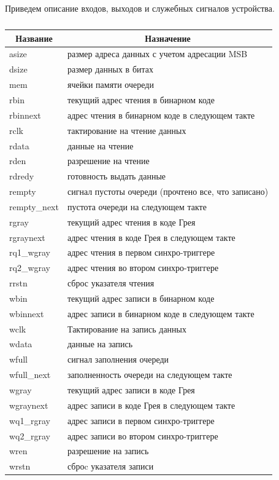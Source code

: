 Приведем описание входов, выходов и служебных сигналов устройства.


\begin{table}[htbp]
	\caption{}
	\centering
	\fontsize{12}{16pt}\selectfont
	\begin{tabular}{|l|l|}
		\hline
		\multicolumn{1}{|c}{\textbf{Название}} & \multicolumn{1}{|c|}{\textbf{Назначение}} \\ \hline
		asize  &  размер адреса данных с учетом адресации MSB \\ \hline
		dsize  &  размер данных в битах \\ \hline
		mem  &  ячейки памяти очереди \\ \hline
		rbin  &  текущий адрес чтения в бинарном коде \\ \hline
		rbinnext  &  адрес чтения в бинарном коде в следующем такте \\ \hline
		rclk  &  тактирование на чтение данных \\ \hline
		rdata  &  данные на чтение \\ \hline
		rden  &  разрешение на чтение \\ \hline
		rdredy  &  готовность выдать данные \\ \hline
		rempty  &  сигнал пустоты очереди (прочтено все, что записано) \\ \hline
		rempty\_next  &  пустота очереди на следующем такте \\ \hline
		rgray  &  текущий адрес чтения в коде Грея \\ \hline
		rgraynext  &  адрес чтения в коде Грея в следующем такте \\ \hline
		rq1\_wgray  &  адрес чтения в первом синхро-триггере \\ \hline
		rq2\_wgray  &  адрес чтения во втором синхро-триггере \\ \hline
		rrstn  &  сброс указателя чтения \\ \hline
		wbin  &  текущий адрес записи в бинарном коде \\ \hline
		wbinnext  &  адрес записи в бинарном коде в следующем такте \\ \hline
		wclk  &  Тактирование на запись данных \\ \hline
		wdata  &  данные на запись \\ \hline
		wfull  &  сигнал заполнения очереди \\ \hline
		wfull\_next  &  заполненность очереди на следующем такте \\ \hline
		wgray  &  текущий адрес записи в коде Грея \\ \hline
		wgraynext  &  адрес записи в коде Грея в следующем такте \\ \hline
		wq1\_rgray  &  адрес записи в первом синхро-триггере \\ \hline
		wq2\_rgray  &  адрес записи во втором синхро-триггере \\ \hline
		wren  &  разрешение на запись \\ \hline
		wrstn  &  сброc указателя записи \\ \hline
	\end{tabular}
	\label{}
\end{table}





\clearpage